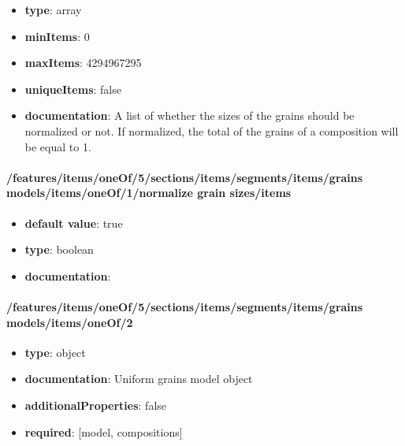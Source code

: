 \begin{itemize}\item {\bf type}: array
\item {\bf minItems}: 0
\item {\bf maxItems}: 4294967295
\item {\bf uniqueItems}: false
\item {\bf documentation}: A list of whether the sizes of the grains should be normalized or not. If normalized, the total of the grains of a composition will be equal to 1.
\end{itemize}\paragraph{/features/items/oneOf/5/sections/items/segments/items/grains models/items/oneOf/1/normalize grain sizes/items}
\begin{itemize}\item {\bf default value}: true
\item {\bf type}: boolean
\item {\bf documentation}: 
\end{itemize}\paragraph{/features/items/oneOf/5/sections/items/segments/items/grains models/items/oneOf/2}
\begin{itemize}\item {\bf type}: object
\item {\bf documentation}: Uniform grains model object
\item {\bf additionalProperties}: false
\item {\bf required}: [model, compositions]\end{itemize}
